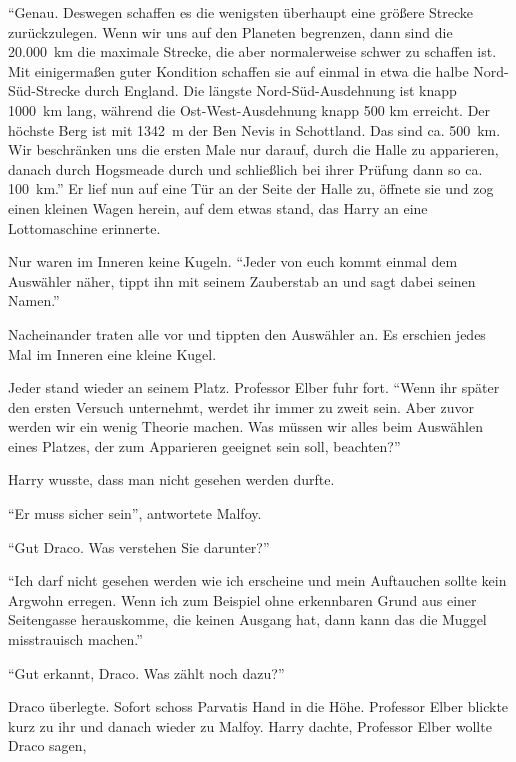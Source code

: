 \enquote{Genau. Deswegen schaffen es die wenigsten überhaupt eine größere Strecke zurückzulegen. Wenn wir uns auf den Planeten begrenzen, dann sind die 20.000~km die maximale Strecke, die aber normalerweise schwer zu schaffen ist. Mit einigermaßen guter Kondition schaffen sie auf einmal in etwa die halbe Nord-Süd-Strecke durch England. Die längste Nord-Süd-Ausdehnung ist knapp 1000~km lang, während die Ost-West-Ausdehnung knapp 500 km erreicht. Der höchste Berg ist mit 1342~m der Ben Nevis in Schottland. Das sind ca. 500~km. Wir beschränken uns die ersten Male nur darauf, durch die Halle zu apparieren, danach durch Hogsmeade durch und schließlich bei ihrer Prüfung dann so ca. 100~km.} Er lief nun auf eine Tür an der Seite der Halle zu, öffnete sie und zog einen kleinen Wagen herein, auf dem etwas stand, das Harry an eine Lottomaschine erinnerte.

Nur waren im Inneren keine Kugeln. \enquote{Jeder von euch kommt einmal dem Auswähler näher, tippt ihn mit seinem Zauberstab an und sagt dabei seinen Namen.}

Nacheinander traten alle vor und tippten den Auswähler an. Es erschien jedes Mal im Inneren eine kleine Kugel.

Jeder stand wieder an seinem Platz. Professor Elber fuhr fort. \enquote{Wenn ihr später den ersten Versuch unternehmt, werdet ihr immer zu zweit sein. Aber zuvor werden wir ein wenig Theorie machen. Was müssen wir alles beim Auswählen eines Platzes, der zum Apparieren geeignet sein soll, beachten?}

Harry wusste, dass man nicht gesehen werden durfte.

\enquote{Er muss sicher sein}, antwortete Malfoy.

\enquote{Gut Draco. Was verstehen Sie darunter?}

\enquote{Ich darf nicht gesehen werden wie ich erscheine und mein Auftauchen sollte kein Argwohn erregen. Wenn ich zum Beispiel ohne erkennbaren Grund aus einer Seitengasse herauskomme, die keinen Ausgang hat, dann kann das die Muggel misstrauisch machen.}

\enquote{Gut erkannt, Draco. Was zählt noch dazu?}

Draco überlegte. Sofort schoss Parvatis Hand in die Höhe. Professor Elber blickte kurz zu ihr und danach wieder zu Malfoy. Harry dachte, Professor Elber wollte Draco sagen, 

